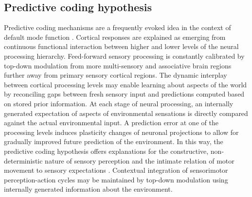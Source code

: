 \documentclass[10pt,letterpaper]{article}
\begin{document}
\subsection{Predictive coding hypothesis}
Predictive coding mechanisms
\citep{clark2013whatever, friston2008hierarchical}
are a frequently evoked idea in the context of default mode function
\citep{bar2007}.
Cortical responses are explained as
emerging from continuous functional interaction between
higher and lower levels of the neural processing hierarchy.
Feed-forward sensory processing is constantly calibrated by
top-down modulation from more multi-sensory and associative brain regions
further away from primary sensory cortical regions.
The dynamic interplay between cortical processing levels
may enable learning about aspects of the world by reconciling
gaps between fresh sensory input and predictions computed
based on stored prior information.
At each stage of neural processing,
an internally generated expectation of aspects of environmental sensations is
directly compared against the actual environmental input.
A prediction error at one of the processing levels
induces plasticity changes of neuronal projections
to allow for gradually improved future prediction of the environment.
In this way,
the predictive coding hypothesis offers explanations for
the constructive, non-deterministic nature of sensory perception
\citep{friston2010free, buzsaki2006rhythms} and
the intimate relation of motor movement to sensory expectations
\citep{wolpert1995internal, kording2004bayesian}.
Contextual integration of sensorimotor perception-action cycles
may be maintained by top-down modulation
using internally generated information about the environment.
\end{document}
